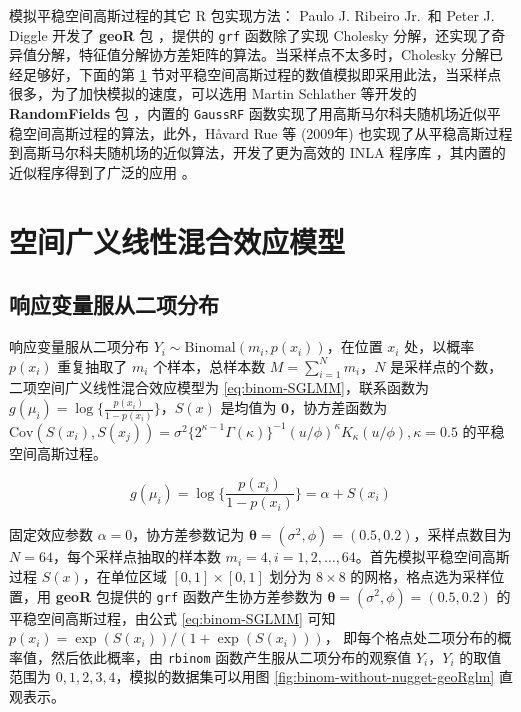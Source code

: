 \documentclass[12pt,a4paper,UTF8,twoside]{book}
\theoremstyle{definition}
\theoremstyle{definition}
\theoremstyle{definition}
\theoremstyle{remark}
\begin{document}
模拟平稳空间高斯过程的其它 R 包实现方法： Paulo J. Ribeiro Jr.~和 Peter
J. Diggle 开发了 \textbf{geoR} 包 \citep{geoR2001}，提供的 \texttt{grf}
函数除了实现 Cholesky
分解，还实现了奇异值分解，特征值分解协方差矩阵的算法。当采样点不太多时，Cholesky
分解已经足够好，下面的第 \ref{sim-sglmm}
节对平稳空间高斯过程的数值模拟即采用此法，当采样点很多，为了加快模拟的速度，可以选用
Martin Schlather 等开发的 \textbf{RandomFields} 包
\citep{RandomFields2015}，内置的 \texttt{GaussRF}
函数实现了用高斯马尔科夫随机场近似平稳空间高斯过程的算法，此外，Håvard
Rue 等 (2009年) \citep{Rue2009}
也实现了从平稳高斯过程到高斯马尔科夫随机场的近似算法，开发了更为高效的
INLA 程序库 \citep{INLA2015}，其内置的近似程序得到了广泛的应用
\citep{Virgilio2018, Blangiardo2015, Faraway2018}。

\hypertarget{sim-sglmm}{%
\section{空间广义线性混合效应模型}\label{sim-sglmm}}

\hypertarget{sim-binomal-sglmm}{%
\subsection{响应变量服从二项分布}\label{sim-binomal-sglmm}}

响应变量服从二项分布
\(Y_{i} \sim \mathrm{Binomal}(m_{i},p(x_{i}))\)，在位置 \(x_i\)
处，以概率 \(p(x_i)\) 重复抽取了 \(m_i\) 个样本，总样本数
\(M=\sum_{i=1}^{N}m_i\)，\(N\)
是采样点的个数，二项空间广义线性混合效应模型为
\eqref{eq:binom-SGLMM}，联系函数为
\(g(\mu_i) = \log\{\frac{p(x_i)}{1-p(x_i)}\}\)，\(S(x)\) 是均值为
\(\mathbf{0}\)，协方差函数为
\(\mathrm{Cov}(S(x_i),S(x_j)) = \sigma^2 \big\{2^{\kappa-1}\Gamma(\kappa)\big\}^{-1}(u/\phi)^{\kappa}K_{\kappa}(u/\phi), \kappa = 0.5\)
的平稳空间高斯过程。

\begin{equation}
g(\mu_i) = \log\{\frac{p(x_i)}{1-p(x_i)}\} = \alpha + S(x_i) \label{eq:binom-SGLMM}
\end{equation}

固定效应参数 \(\alpha = 0\)，协方差参数记为
\(\boldsymbol{\theta} = (\sigma^2, \phi) = (0.5, 0.2)\)，采样点数目为
\(N = 64\)，每个采样点抽取的样本数
\(m_i = 4, i = 1, 2, \ldots, 64\)。首先模拟平稳空间高斯过程
\(S(x)\)，在单位区域 \([0,1] \times [0,1]\) 划分为 \(8 \times 8\)
的网格，格点选为采样位置，用 \textbf{geoR} 包提供的 \texttt{grf}
函数产生协方差参数为
\(\boldsymbol{\theta} = (\sigma^2,\phi) = (0.5, 0.2)\)
的平稳空间高斯过程，由公式 \eqref{eq:binom-SGLMM} 可知
\(p(x_i) = \exp(S(x_i))/(1 + \exp(S(x_i)))\)，
即每个格点处二项分布的概率值，然后依此概率，由 \texttt{rbinom}
函数产生服从二项分布的观察值 \(Y_i\)，\(Y_i\) 的取值范围为
\(0, 1, 2, 3, 4\)，模拟的数据集可以用图
\ref{fig:binom-without-nugget-geoRglm} 直观表示。
\end{document}
